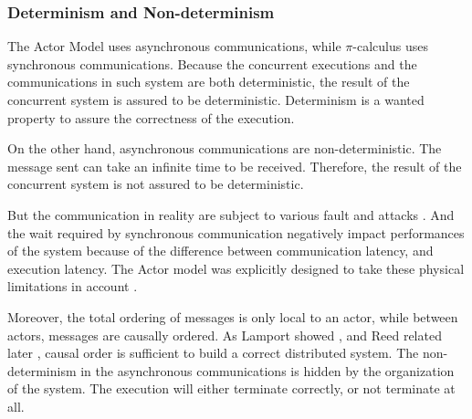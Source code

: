 


\subsubsection{Determinism and Non-determinism}


The Actor Model uses asynchronous communications, while $\pi$-calculus uses synchronous communications.
Because the concurrent executions and the communications in such system are both deterministic, the result of the concurrent system is assured to be deterministic.
Determinism is a wanted property to assure the correctness of the execution.

On the other hand, asynchronous communications are non-deterministic.
The message sent can take an infinite time to be received.
Therefore, the result of the concurrent system is not assured to be deterministic.

But the communication in reality are subject to various fault and attacks \cite{Lamport1982}.
And the wait required by synchronous communication negatively impact performances of the system because of the difference between communication latency, and execution latency.
The Actor model was explicitly designed to take these physical limitations in account \cite{Hewitt1977a}.

Moreover, the total ordering of messages is only local to an actor, while between actors, messages are causally ordered.
As Lamport showed \cite{Lamport1978}, and Reed related later \cite{Reed2012}, causal order is sufficient to build a correct distributed system.
The non-determinism in the asynchronous communications is hidden by the organization of the system.
The execution will either terminate correctly, or not terminate at all.

